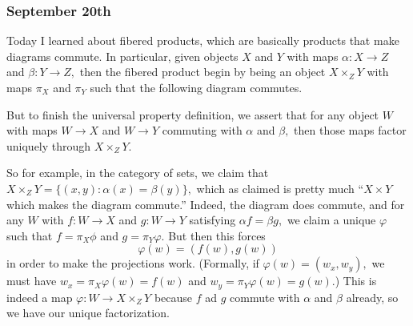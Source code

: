 \subsubsection{September 20th}
Today I learned about fibered products, which are basically products that make diagrams commute. In particular, given objects $X$ and $Y$ with maps $\alpha:X\to Z$ and $\beta:Y\to Z,$ then the fibered product begin by being an object $X\times_ZY$ with maps $\pi_X$ and $\pi_Y$ such that the following diagram commutes.
\begin{center}
\end{center}
But to finish the universal property definition, we assert that for any object $W$ with maps $W\to X$ and $W\to Y$ commuting with $\alpha$ and $\beta,$ then those maps factor uniquely through $X\times_ZY.$
\begin{center}
\end{center}

So for example, in the category of sets, we claim that $X\times_ZY=\{(x,y):\alpha(x)=\beta(y)\},$ which as claimed is pretty much ``$X\times Y$ which makes the diagram commute.'' Indeed, the diagram does commute, and for any $W$ with $f:W\to X$ and $g:W\to Y$ satisfying $\alpha f=\beta g,$ we claim a unique $\varphi$ such that $f=\pi_X\phi$ and $g=\pi_Y\varphi.$ But then this forces
\[\varphi(w)=(f(w),g(w))\]
in order to make the projections work. (Formally, if $\varphi(w)=(w_x,w_y),$ we must have $w_x=\pi_X\varphi(w)=f(w)$ and $w_y=\pi_Y\varphi(w)=g(w).$) This is indeed a map $\varphi:W\to X\times_ZY$ because $f$ ad $g$ commute with $\alpha$ and $\beta$ already, so we have our unique factorization.

